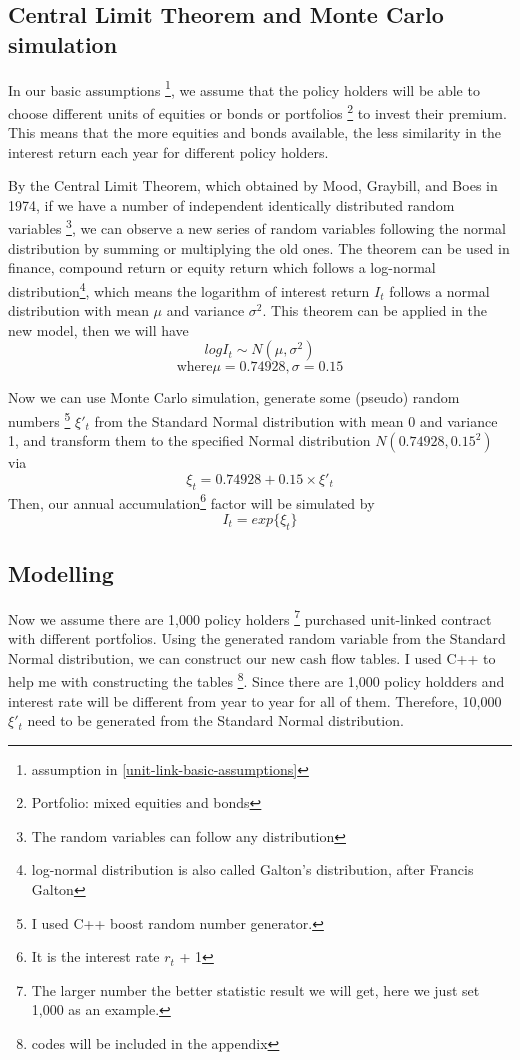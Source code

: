 \documentclass{report}
\begin{document}
\subsection{Central Limit Theorem and Monte Carlo simulation}

In our basic assumptions \footnote{assumption in \ref{unit-link-basic-assumptions}}, we assume that the policy holders will be able to choose different units of equities or bonds or portfolios \footnote{Portfolio: mixed equities and bonds} to invest their premium. This means that the more equities and bonds available, the less similarity in the interest return each year for different policy holders. 

By \cite{bib:CLT}the Central Limit Theorem, which obtained by Mood, Graybill, and Boes in 1974, if we have a number of independent identically distributed random variables \footnote{The random variables can follow any distribution}, we can observe a new series of random variables following the normal distribution by summing or multiplying the old ones. The theorem can be used in finance, compound return or equity return which follows a log-normal distribution\footnote{log-normal distribution is also called Galton's distribution, after Francis Galton}, which means the logarithm of interest return $I_t$ follows a normal distribution with mean $\mu$ and variance $\sigma^2$. This theorem can be applied in the new model, then we will have
\[
logI_t  \sim N(\mu,\sigma^2)
\]
\[
\text{where}   \mu= 0.74928, \sigma= 0.15 
\]

Now we can use Monte Carlo simulation\cite{bib:MCS}, generate some (pseudo) random numbers \footnote{I used C++ boost random number generator.} $\xi'_t$ from the Standard Normal distribution with mean 0 and variance 1, and transform them to the specified Normal distribution $N(0.74928,0.15^2)$ via   
\[
\xi_t = 0.74928 + 0.15\times \xi'_t
\]
Then, our annual accumulation\footnote{It is the interest rate $r_t$ + 1} factor will be simulated by 
\[
I_t=exp\{\xi_t\} 
\]



\subsection{Modelling}

Now we assume there are 1,000 policy holders \footnote{The larger number the better statistic result we will get, here we just set 1,000 as an example.} purchased unit-linked contract with different portfolios. Using the generated random variable from the Standard Normal distribution, we can construct our new cash flow tables. I used C++ to help me with constructing the tables \footnote{codes will be included in the appendix}. Since there are 1,000 policy holdders and interest rate will be different from year to year for all of them. Therefore, 10,000  $\xi'_t$ need to be generated from the Standard Normal distribution.
\end{document}
